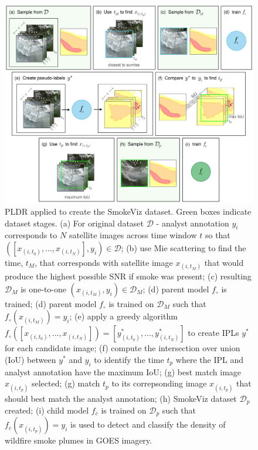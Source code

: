 \documentclass{article}
\begin{document}
\begin{figure}[!htb]
    \centering
    \includegraphics[width=\linewidth]{figures/workflow_small.png}
    \caption{
        PLDR applied to create the SmokeViz dataset. Green boxes indicate dataset stages. 
        (a) For original dataset \(\mathcal{D}\) - analyst annotation \(y_i\) corresponds to \(N\) satellite images across time window \(t\) so that \(([x_{(i,t_0)},...,x_{(i,t_N)}], y_i) \in \mathcal{D}\); 
        (b) use Mie scattering to find the time, \(t_M\), that corresponds with satellite image \(x_{(i,t_M)}\) that would produce the highest possible SNR if smoke was present; 
        (c) resulting \(\mathcal{D}_M\) is one-to-one \((x_{(i,t_M)}, y_i) \in \mathcal{D}_M\);
        (d) parent model \(f_\circ\) is trained; 
        (d) parent model \(f_\circ\) is trained on \(\mathcal{D}_M\) such that \(f_\circ(x_{(i,t_M)})=y_i\);
        (e) apply a greedy algorithm \(f_\circ([x_{(i,t_0)},...,x_{(i,t_N)}])=[y^*_{(i,t_0)},...,y^*_{(i,t_N)}]\) to create IPLs \(y^*\) for each candidate image; 
        (f) compute the intersection over union (IoU) between \(y^*\) and \(y_i\) to identify the time \(t_p\) where the IPL and analyst annotation have the maximum IoU; 
        (g) best match image \(x_{(i,t_p)}\) selected; 
        (g) match \(t_p\) to its correpsonding image \(x_{(i,t_p)}\) that should best match the analyst annotation;
        (h) SmokeViz dataset \(\mathcal{D}_p\) created; 
        (i) child model \(f_c\) is trained on \(\mathcal{D}_p\) such that \(f_c(x_{(i,t_p)})=y_i\) is used to detect and classify the density of wildfire smoke plumes in GOES imagery.
    }
\label{PLDR}
\end{figure}
\end{document}
